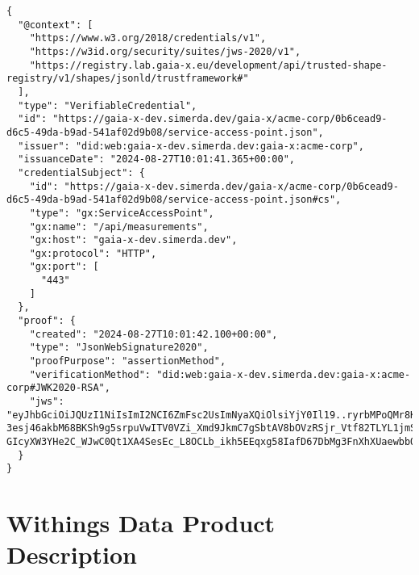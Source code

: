 \begin{verbatim}
{
  "@context": [
    "https://www.w3.org/2018/credentials/v1",
    "https://w3id.org/security/suites/jws-2020/v1",
    "https://registry.lab.gaia-x.eu/development/api/trusted-shape-registry/v1/shapes/jsonld/trustframework#"
  ],
  "type": "VerifiableCredential",
  "id": "https://gaia-x-dev.simerda.dev/gaia-x/acme-corp/0b6cead9-d6c5-49da-b9ad-541af02d9b08/service-access-point.json",
  "issuer": "did:web:gaia-x-dev.simerda.dev:gaia-x:acme-corp",
  "issuanceDate": "2024-08-27T10:01:41.365+00:00",
  "credentialSubject": {
    "id": "https://gaia-x-dev.simerda.dev/gaia-x/acme-corp/0b6cead9-d6c5-49da-b9ad-541af02d9b08/service-access-point.json#cs",
    "type": "gx:ServiceAccessPoint",
    "gx:name": "/api/measurements",
    "gx:host": "gaia-x-dev.simerda.dev",
    "gx:protocol": "HTTP",
    "gx:port": [
      "443"
    ]
  },
  "proof": {
    "created": "2024-08-27T10:01:42.100+00:00",
    "type": "JsonWebSignature2020",
    "proofPurpose": "assertionMethod",
    "verificationMethod": "did:web:gaia-x-dev.simerda.dev:gaia-x:acme-corp#JWK2020-RSA",
    "jws": "eyJhbGciOiJQUzI1NiIsImI2NCI6ZmFsc2UsImNyaXQiOlsiYjY0Il19..ryrbMPoQMr8KzaFNrOHYLv4UzIPEKwW5FLAKveVg4ydWVJbm2qcF68eyEz4MSKIz9VzncSHeWFAf7ZK3pQE_oUei72Yk4kwIi0MU_lJYOrEfYSq_daUhAaSo16d3wv1BZ0uGVruxKkvfig8Upk-3esj46akbM68BKSh9g5srpuVwITV0VZi_Xmd9JkmC7gSbtAV8bOVzRSjr_Vtf82TLYL1jmS79kZaymmCYwXrJzavucDzaBKgfk9SxH-GIcyXW3YHe2C_WJwC0Qt1XA4SesEc_L8OCLb_ikh5EEqxg58IafD67DbMg3FnXhXUaewbbOatiCQTIqW4BvVam3eguFg"
  }
}
\end{verbatim}


\section{Withings Data Product Description}

